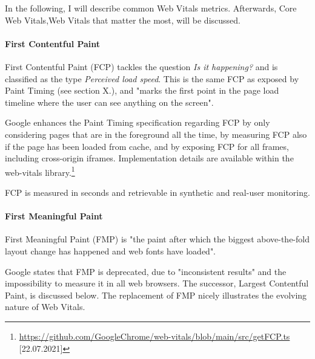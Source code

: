 
In the following, I will describe common Web Vitals metrics.
Afterwards, Core Web Vitals,Web Vitals that matter the most, will be discussed.





\paragraph{First Contentful Paint}

First Contentful Paint (FCP) tackles the question \textit{Is it happening?} and is classified as the type \textit{Perceived load speed}.
This is the same FCP as exposed by Paint Timing (see section X.), and "marks the first point in the page load timeline where the user can see anything on the screen". %

Google enhances the Paint Timing specification regarding FCP by only considering pages that are in the foreground all the time,
by measuring FCP also if the page has been loaded from cache, and by exposing FCP for all frames, including cross-origin iframes.
Implementation details are available within the web-vitals library.\footnote{\url{https://github.com/GoogleChrome/web-vitals/blob/main/src/getFCP.ts} [22.07.2021]}

FCP is measured in seconds and retrievable in synthetic and real-user monitoring.




\paragraph{First Meaningful Paint}

First Meaningful Paint (FMP) is "the paint after which the biggest above-the-fold layout change has happened and web fonts have loaded". %

Google states that FMP is deprecated, due to "inconsistent results" and the impossibility to measure it in all web browsers. %
The successor, Largest Contentful Paint, is discussed below.
The replacement of FMP nicely illustrates the evolving nature of Web Vitals.



